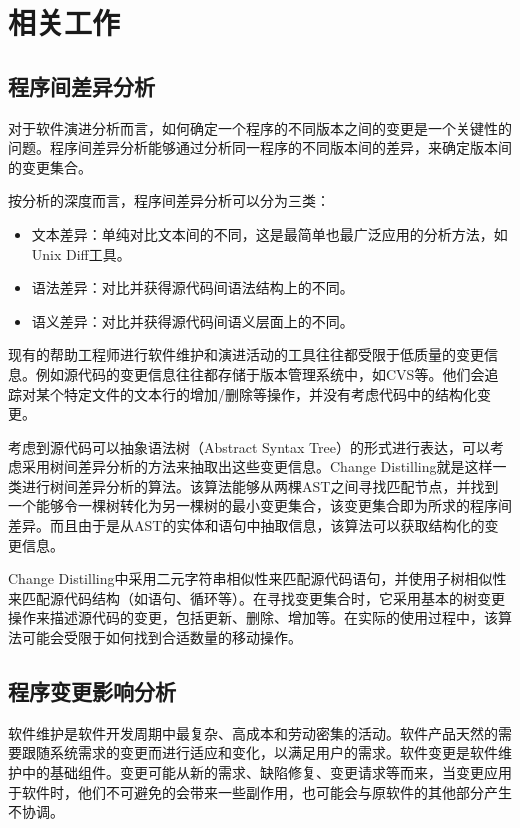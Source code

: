 \chapter{相关工作}
\section{程序间差异分析}

对于软件演进分析而言，如何确定一个程序的不同版本之间的变更是一个关键性的问题\cite{kim2013identifying}。程序间差异分析能够通过分析同一程序的不同版本间的差异，来确定版本间的变更集合\cite{lahiri2010differential,winstead2003towards}。

按分析的深度而言，程序间差异分析可以分为三类：
\begin{itemize}
	\item 文本差异：单纯对比文本间的不同，这是最简单也最广泛应用的分析方法，如Unix Diff工具。
	\item 语法差异：对比并获得源代码间语法结构上的不同。
	\item 语义差异：对比并获得源代码间语义层面上的不同。
\end{itemize}

现有的帮助工程师进行软件维护和演进活动的工具往往都受限于低质量的变更信息。例如源代码的变更信息往往都存储于版本管理系统中，如CVS等。他们会追踪对某个特定文件的文本行的增加/删除等操作，并没有考虑代码中的结构化变更。

考虑到源代码可以抽象语法树（Abstract Syntax Tree）的形式进行表达，可以考虑采用树间差异分析的方法来抽取出这些变更信息。Change Distilling就是这样一类进行树间差异分析的算法\cite{fluri2007change,gall2009change}。该算法能够从两棵AST之间寻找匹配节点，并找到一个能够令一棵树转化为另一棵树的最小变更集合，该变更集合即为所求的程序间差异。而且由于是从AST的实体和语句中抽取信息，该算法可以获取结构化的变更信息。

Change Distilling中采用二元字符串相似性来匹配源代码语句，并使用子树相似性来匹配源代码结构（如语句、循环等）。在寻找变更集合时，它采用基本的树变更操作来描述源代码的变更，包括更新、删除、增加等。在实际的使用过程中，该算法可能会受限于如何找到合适数量的移动操作。

\section{程序变更影响分析}
软件维护是软件开发周期中最复杂、高成本和劳动密集的活动。软件产品天然的需要跟随系统需求的变更而进行适应和变化，以满足用户的需求。软件变更是软件维护中的基础组件。变更可能从新的需求、缺陷修复、变更请求等而来，当变更应用于软件时，他们不可避免的会带来一些副作用，也可能会与原软件的其他部分产生不协调。

